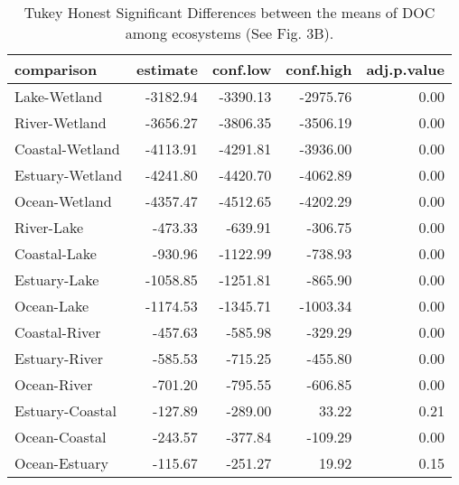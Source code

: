 \begin{table}[ht]
\centering
\begin{tabular}{lrrrr}
  \hline
comparison & estimate & conf.low & conf.high & adj.p.value \\ 
  \hline
Lake-Wetland & -3182.94 & -3390.13 & -2975.76 & 0.00 \\ 
  River-Wetland & -3656.27 & -3806.35 & -3506.19 & 0.00 \\ 
  Coastal-Wetland & -4113.91 & -4291.81 & -3936.00 & 0.00 \\ 
  Estuary-Wetland & -4241.80 & -4420.70 & -4062.89 & 0.00 \\ 
  Ocean-Wetland & -4357.47 & -4512.65 & -4202.29 & 0.00 \\ 
  River-Lake & -473.33 & -639.91 & -306.75 & 0.00 \\ 
  Coastal-Lake & -930.96 & -1122.99 & -738.93 & 0.00 \\ 
  Estuary-Lake & -1058.85 & -1251.81 & -865.90 & 0.00 \\ 
  Ocean-Lake & -1174.53 & -1345.71 & -1003.34 & 0.00 \\ 
  Coastal-River & -457.63 & -585.98 & -329.29 & 0.00 \\ 
  Estuary-River & -585.53 & -715.25 & -455.80 & 0.00 \\ 
  Ocean-River & -701.20 & -795.55 & -606.85 & 0.00 \\ 
  Estuary-Coastal & -127.89 & -289.00 & 33.22 & 0.21 \\ 
  Ocean-Coastal & -243.57 & -377.84 & -109.29 & 0.00 \\ 
  Ocean-Estuary & -115.67 & -251.27 & 19.92 & 0.15 \\ 
   \hline
\end{tabular}
\caption{Tukey Honest Significant Differences between the means of DOC among ecosystems (See Fig. 3B).} 
\end{table}
